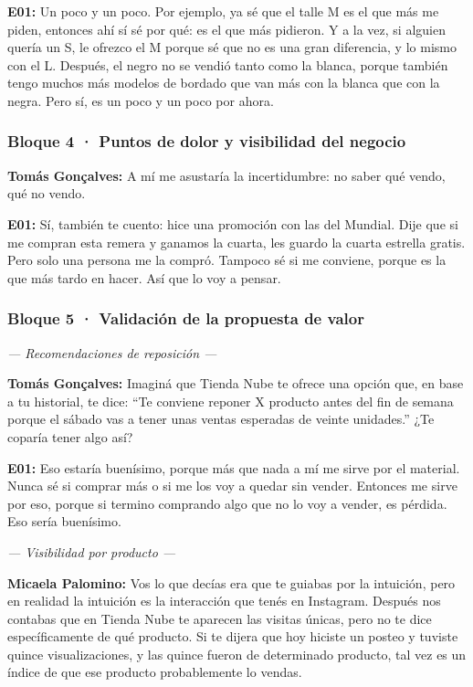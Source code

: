 \noindent\textbf{E01:} Un poco y un poco. Por ejemplo, ya sé que el talle M es el que más me piden, entonces ahí sí sé por qué: es el que más pidieron. Y a la vez, si alguien quería un S, le ofrezco el M porque sé que no es una gran diferencia, y lo mismo con el L. Después, el negro no se vendió tanto como la blanca, porque también tengo muchos más modelos de bordado que van más con la blanca que con la negra. Pero sí, es un poco y un poco por ahora.

\subsubsection*{Bloque 4 · Puntos de dolor y visibilidad del negocio}

\noindent\textbf{Tomás Gonçalves:} A mí me asustaría la incertidumbre: no saber qué vendo, qué no vendo.

\noindent\textbf{E01:} Sí, también te cuento: hice una promoción con las del Mundial. Dije que si me compran esta remera y ganamos la cuarta, les guardo la cuarta estrella gratis. Pero solo una persona me la compró. Tampoco sé si me conviene, porque es la que más tardo en hacer. Así que lo voy a pensar.

\subsubsection*{Bloque 5 · Validación de la propuesta de valor}

\noindent\textit{--- Recomendaciones de reposición ---}

\noindent\textbf{Tomás Gonçalves:} Imaginá que Tienda Nube te ofrece una opción que, en base a tu historial, te dice: ``Te conviene reponer X producto antes del fin de semana porque el sábado vas a tener unas ventas esperadas de veinte unidades.'' ¿Te coparía tener algo así?

\noindent\textbf{E01:} Eso estaría buenísimo, porque más que nada a mí me sirve por el material. Nunca sé si comprar más o si me los voy a quedar sin vender. Entonces me sirve por eso, porque si termino comprando algo que no lo voy a vender, es pérdida. Eso sería buenísimo.

\noindent\textit{--- Visibilidad por producto ---}

\noindent\textbf{Micaela Palomino:} Vos lo que decías era que te guiabas por la intuición, pero en realidad la intuición es la interacción que tenés en Instagram. Después nos contabas que en Tienda Nube te aparecen las visitas únicas, pero no te dice específicamente de qué producto. Si te dijera que hoy hiciste un posteo y tuviste quince visualizaciones, y las quince fueron de determinado producto, tal vez es un índice de que ese producto probablemente lo vendas.

